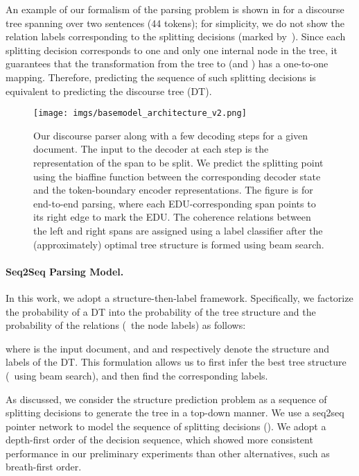 An example of our formalism of the parsing problem is shown in  for a discourse tree spanning over two sentences {(44 tokens)}; for simplicity, we do not show the relation labels corresponding to the splitting decisions (marked by~). Since each splitting decision corresponds to one and only one internal node in the tree, it guarantees that the transformation from the tree to  (and ) has a one-to-one mapping. Therefore, predicting the sequence of such splitting decisions is equivalent to predicting the discourse tree (DT).   


\begin{figure*}[t!]
\centering
\texttt{[image: imgs/basemodel\_architecture\_v2.png]}
\caption{\small Our discourse parser along with a few decoding steps for a given document. The input to the decoder at each step is the representation of the span to be split. We predict the splitting point using the biaffine function between the corresponding decoder state and the token-boundary encoder representations. The figure is for end-to-end parsing, where each EDU-corresponding span points to its right edge to mark the EDU. The coherence relations between the left and right spans are assigned using a label classifier after the (approximately) optimal tree structure is formed using beam search.}
\label{fig:discourse_parsing_base_architecture}
\end{figure*}


\paragraph{Seq2Seq Parsing Model.}

In this work, we adopt a structure-then-label framework. Specifically, we factorize the probability of a DT into the probability of the tree structure and the probability of the relations (\ie\ the node labels) as follows:

\small 

\normalsize

\noindent where  is the input document, and  and  respectively denote the structure and labels of the DT. This formulation allows us to first infer the best tree structure (\eg\ using beam search), and then find the corresponding labels. 

As discussed, we consider the structure prediction problem as a sequence  of splitting decisions to generate the tree in a top-down manner. We use a seq2seq pointer network \citep{VinyalsNIPS2015} to model the sequence of splitting decisions (). We adopt a depth-first order of the decision sequence, which showed more consistent performance in our preliminary experiments than other alternatives, such as breath-first order. 


